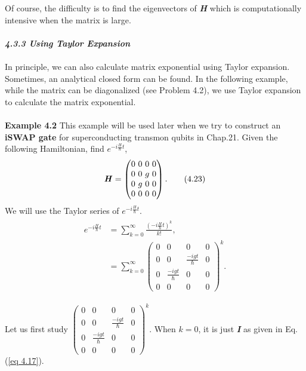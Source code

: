 \documentclass{article}
\begin{document}
Of course, the difficulty is to find the eigenvectors of \textbf{\textit{H}}
which is computationally intensive when the matrix is large.
\\\\
\textit{\textbf{\large 4.3.3 Using Taylor Expansion}}
\\\\
In principle, we can also calculate matrix exponential using Taylor expansion.
Sometimes, an analytical closed form can be found. In the following example,
while the matrix can be diagonalized (see Problem 4.2), we use Taylor expansion to 
calculate the matrix exponential.
\\\\
\textbf{Example 4.2} This example will be used later when we try to construct an
\textbf{iSWAP gate} for superconducting transmon qubits in Chap.21.
Given the following Hamiltonian, find $e^{-i\frac{H}{\hbar}t}$,
\begin{equation} \label{eq 4.23}
    \textbf{\textit{H}}=\begin{pmatrix}
        0\  0\ 0\ 0\\0\ 0\ g\ 0\\0\ g\ 0\ 0\\0\ 0\ 0\ 0
    \end{pmatrix}.\tag{4.23}
\end{equation}
We will use the Taylor series of $e^{-i\frac{H}{\hbar}t}$.
\begin{align} \label{eq 4.24}
    \begin{split}
        e^{-i\frac{H}{\hbar}t}&=\sum_{k=0}^{\infty}\frac{(-i\frac{H}{\hbar}t)^k}{k!},\\
        &=\sum_{k=0}^{\infty}\begin{pmatrix}
            0& 0& 0& 0\\0& 0& \frac{-igt}{\hbar}& 0\\
            0& \frac{-igt}{\hbar}& 0& 0\\ 0& 0& 0& 0
        \end{pmatrix}^k. 
    \end{split}\tag{4.24}
\end{align}

Let us first study $\begin{pmatrix}
            0& 0& 0& 0\\0& 0& \frac{-igt}{\hbar}& 0\\
            0& \frac{-igt}{\hbar}& 0& 0\\ 0& 0& 0& 0
        \end{pmatrix}^k$. When $k=0$, it is just \textbf{\textit{I}} as given in
        Eq. (\ref{eq 4.17}).
\end{document}
